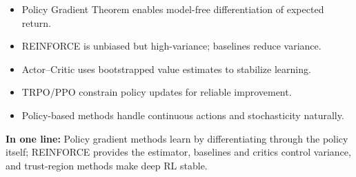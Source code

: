 \documentclass[12pt]{article}
\begin{document}
\begin{itemize}
		\item Policy Gradient Theorem enables model-free differentiation of expected return.
		\item REINFORCE is unbiased but high-variance; baselines reduce variance.
		\item Actor--Critic uses bootstrapped value estimates to stabilize learning.
		\item TRPO/PPO constrain policy updates for reliable improvement.
		\item Policy-based methods handle continuous actions and stochasticity naturally.
\end{itemize}

\noindent
\textbf{In one line:}
Policy gradient methods learn by differentiating through the policy itself;
REINFORCE provides the estimator, baselines and critics control variance,
and trust-region methods make deep RL stable.
\end{document}
